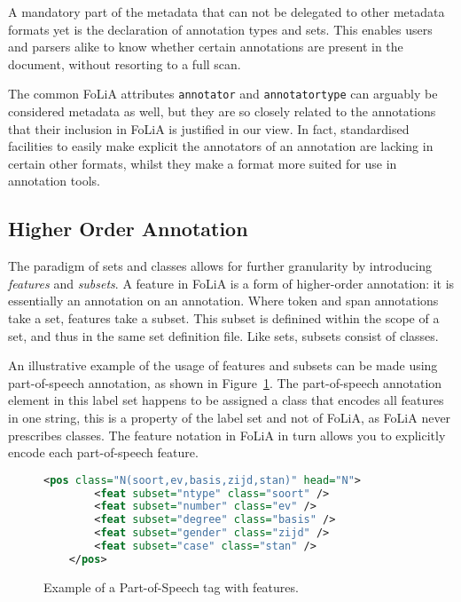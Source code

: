 \documentclass[a4paper,10pt,twoside]{article}
\begin{document}
A mandatory part of the metadata that can not be delegated to other metadata
formats yet is the declaration of annotation types and sets. This enables users
and parsers alike to know whether certain annotations are present in the
document, without resorting to a full scan. 

The common FoLiA attributes \texttt{annotator} and
\texttt{annotatortype} can arguably be considered metadata as well, but they are so closely
related to the annotations that their inclusion in FoLiA is justified in our view. In
fact, standardised facilities to easily make explicit the annotators of an
annotation are lacking in certain other formats, whilst they make a format more
suited for use in annotation tools.



\subsection{Higher Order Annotation}
\label{sec:higherorder}
\label{sec:features}

The paradigm of sets and classes allows for further granularity by introducing
\emph{features} and \emph{subsets}. A feature in FoLiA is a form of
higher-order annotation: it is essentially an annotation on an annotation.
Where token and span annotations take a set, features take a subset. This
subset is definined within the scope of a set, and thus in the same set
definition file. Like sets, subsets consist of classes.

An illustrative example of the usage of features and subsets can be made using
part-of-speech annotation, as shown in Figure~\ref{fig:features}. The
part-of-speech annotation element in this label set happens to be assigned a
class that encodes all features in one string, this is a property of the label
set and not of FoLiA, as FoLiA never prescribes classes. The feature notation
in FoLiA in turn allows you to explicitly encode each part-of-speech feature. 


\begin{figure}[tbh]
\begin{lstlisting}[language=xml]
    <pos class="N(soort,ev,basis,zijd,stan)" head="N">
        <feat subset="ntype" class="soort" />
        <feat subset="number" class="ev" />
        <feat subset="degree" class="basis" />
        <feat subset="gender" class="zijd" />
        <feat subset="case" class="stan" />
    </pos>
\end{lstlisting}
\caption{Example of a Part-of-Speech tag with features.\label{fig:features}}
\end{figure}
\end{document}
